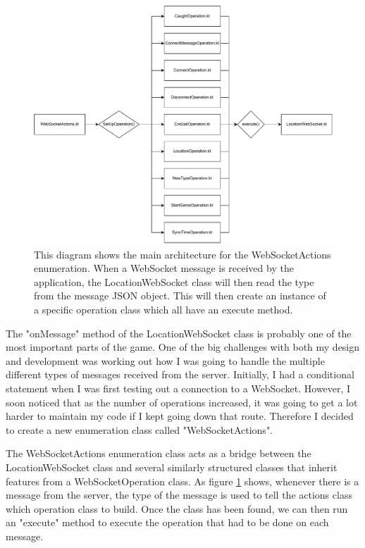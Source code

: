 \documentclass{l4proj}
\begin{document}
\begin{figure}
    \centering
    \includegraphics[width=\linewidth]{images/LocationActionsEnumDiagram.pdf}    

    \caption{
        This diagram shows the main architecture for the WebSocketActions enumeration. When a
        WebSocket message is received by the application, the LocationWebSocket class will then
        read the type from the message JSON object. This will then create an instance of a specific
        operation class which all have an execute method.   
    }

    \label{fig:locationActions} 
\end{figure}

The "onMessage" method of the LocationWebSocket class is probably one of the most important parts of the game.
One of the big challenges with both my design and development was working out how I was going to handle the multiple
different types of messages received from the server. Initially, I had a conditional statement when I was first
testing out a connection to a WebSocket. However, I soon noticed that as the number of operations increased, it
was going to get a lot harder to maintain my code if I kept going down that route. Therefore I decided to create
a new enumeration class called "WebSocketActions".

The WebSocketActions enumeration class acts as a bridge between the LocationWebSocket class and several similarly
structured classes that inherit features from a WebSocketOperation class. As figure \ref{fig:locationActions} shows, 
whenever there is a message from the server, the type of the message is used to tell the actions class which operation
class to build. Once the class has been found, we can then run an "execute" method to execute the operation that had
to be done on each message.
\end{document}
